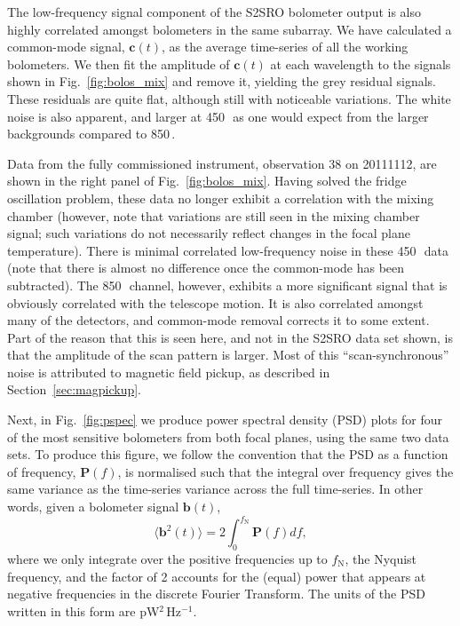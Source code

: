 \documentclass[useAMS,usenatbib,nofootinbib]{mn2e}
\begin{document}
The low-frequency signal component of the S2SRO bolometer output is
also highly correlated amongst bolometers in the same subarray. We
have calculated a common-mode signal, $\mathbf{c}(t)$, as the average
time-series of all the working bolometers. We then fit the amplitude
of $\mathbf{c}(t)$ at each wavelength to the signals shown in
Fig.~\ref{fig:bolos_mix} and remove it, yielding the grey residual
signals. These residuals are quite flat, although still with
noticeable variations. The white noise is also apparent, and larger at
450\,\micron\ as one would expect from the larger backgrounds compared
to 850\,\micron.

Data from the fully commissioned instrument, observation 38 on
20111112, are shown in the right panel of
Fig.~\ref{fig:bolos_mix}. Having solved the fridge oscillation
problem, these data no longer exhibit a correlation with the mixing
chamber (however, note that variations are still seen in the mixing
chamber signal; such variations do not necessarily reflect changes in
the focal plane temperature). There is minimal correlated
low-frequency noise in these 450\,\micron\ data (note that there is
almost no difference once the common-mode has been subtracted). The
850\,\micron\ channel, however, exhibits a more significant signal
that is obviously correlated with the telescope motion. It is also
correlated amongst many of the detectors, and common-mode removal
corrects it to some extent. Part of the reason that this is seen here,
and not in the S2SRO data set shown, is that the amplitude of the scan
pattern is larger. Most of this ``scan-synchronous'' noise is
attributed to magnetic field pickup, as described in
Section~\ref{sec:magpickup}.

Next, in Fig.~\ref{fig:pspec} we produce power spectral density (PSD)
plots for four of the most sensitive bolometers from both focal
planes, using the same two data sets. To produce this figure, we
follow the convention that the PSD as a function of frequency,
$\mathbf{P}(f)$, is normalised such that the integral over frequency
gives the same variance as the time-series variance across the full
time-series. In other words, given a bolometer signal $\mathbf{b}(t)$,
%
\begin{equation}
\label{eq:psd}
\langle\mathbf{b}^2(t)\rangle = 2 \int_0^{f_\mathrm{N}} \mathbf{P}(f)
df ,
\end{equation}
%
where we only integrate over the positive frequencies up to
$f_\mathrm{N}$, the Nyquist frequency, and the factor of 2 accounts
for the (equal) power that appears at negative frequencies in the
discrete Fourier Transform. The units of the PSD written in this form
are pW$^2$\,Hz$^{-1}$.
\end{document}
